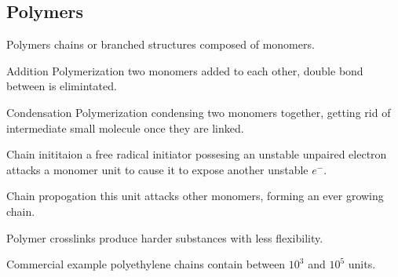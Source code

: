 \begin{mdframed}
    \subsection{Polymers}

\begin{multicols}{3}
\begin{compactdesc}
\item[Polymers] chains or branched structures composed of monomers.
\item[Addition Polymerization] two monomers added to each other, double bond
    between is elimintated.
\item[Condensation Polymerization] condensing two monomers together, getting
    rid of intermediate small molecule once they are linked.
\item[Chain inititaion] a free radical initiator possesing an unstable
    unpaired electron attacks a monomer unit to cause it to expose another
    unstable $e^{-}$.
\item[Chain propogation] this unit attacks other monomers, forming an ever
    growing chain.
\item[Polymer crosslinks] produce harder substances with less flexibility.
\item[Commercial example] polyethylene chains contain between $10^3$ and
    $10^5$  units.
\end{compactdesc}
\end{multicols}
\end{mdframed}



%

